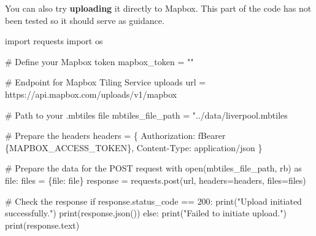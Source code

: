 \documentclass[
  letterpaper,
  DIV=11,
  numbers=noendperiod]{scrreprt}
\newenvironment{Shaded}{\begin{snugshade}}{\end{snugshade}}
\newcommand{\BuiltInTok}[1]{\textcolor[rgb]{0.00,0.23,0.31}{#1}}
\newcommand{\CommentTok}[1]{\textcolor[rgb]{0.37,0.37,0.37}{#1}}
\newcommand{\ControlFlowTok}[1]{\textcolor[rgb]{0.00,0.23,0.31}{#1}}
\newcommand{\DecValTok}[1]{\textcolor[rgb]{0.68,0.00,0.00}{#1}}
\newcommand{\ErrorTok}[1]{\textcolor[rgb]{0.68,0.00,0.00}{#1}}
\newcommand{\ImportTok}[1]{\textcolor[rgb]{0.00,0.46,0.62}{#1}}
\newcommand{\NormalTok}[1]{\textcolor[rgb]{0.00,0.23,0.31}{#1}}
\newcommand{\OperatorTok}[1]{\textcolor[rgb]{0.37,0.37,0.37}{#1}}
\newcommand{\SpecialCharTok}[1]{\textcolor[rgb]{0.37,0.37,0.37}{#1}}
\newcommand{\SpecialStringTok}[1]{\textcolor[rgb]{0.13,0.47,0.30}{#1}}
\newcommand{\StringTok}[1]{\textcolor[rgb]{0.13,0.47,0.30}{#1}}
\begin{document}
You can also try \textbf{uploading} it directly to Mapbox. This part of
the code has not been tested so it should serve as guidance.

\begin{Shaded}
\begin{Highlighting}[]
\ImportTok{import}\NormalTok{ requests}
\ImportTok{import}\NormalTok{ os}

\CommentTok{\# Define your Mapbox token}
\NormalTok{mapbox\_token }\OperatorTok{=} \StringTok{""}

\CommentTok{\# Endpoint for Mapbox Tiling Service uploads}
\NormalTok{url }\OperatorTok{=} \StringTok{\textquotesingle{}https://api.mapbox.com/uploads/v1/mapbox\textquotesingle{}}

\CommentTok{\# Path to your .mbtiles file}
\NormalTok{mbtiles\_file\_path }\OperatorTok{=} \StringTok{"../data/liverpool.mbtiles\textquotesingle{}}

\ErrorTok{\# Prepare the headers}
\NormalTok{headers }\OperatorTok{=}\NormalTok{ \{}
    \StringTok{\textquotesingle{}Authorization\textquotesingle{}}\NormalTok{: }\SpecialStringTok{f\textquotesingle{}Bearer }\SpecialCharTok{\{}\NormalTok{MAPBOX\_ACCESS\_TOKEN}\SpecialCharTok{\}}\SpecialStringTok{\textquotesingle{}}\NormalTok{,}
    \StringTok{\textquotesingle{}Content{-}Type\textquotesingle{}}\NormalTok{: }\StringTok{\textquotesingle{}application/json\textquotesingle{}}
\NormalTok{\}}

\CommentTok{\# Prepare the data for the POST request}
\ControlFlowTok{with} \BuiltInTok{open}\NormalTok{(mbtiles\_file\_path, }\StringTok{\textquotesingle{}rb\textquotesingle{}}\NormalTok{) }\ImportTok{as} \BuiltInTok{file}\NormalTok{:}
\NormalTok{    files }\OperatorTok{=}\NormalTok{ \{}\StringTok{\textquotesingle{}file\textquotesingle{}}\NormalTok{: }\BuiltInTok{file}\NormalTok{\}}
\NormalTok{    response }\OperatorTok{=}\NormalTok{ requests.post(url, headers}\OperatorTok{=}\NormalTok{headers, files}\OperatorTok{=}\NormalTok{files)}

\CommentTok{\# Check the response}
\ControlFlowTok{if}\NormalTok{ response.status\_code }\OperatorTok{==} \DecValTok{200}\NormalTok{:}
    \BuiltInTok{print}\NormalTok{(}\StringTok{"Upload initiated successfully."}\NormalTok{)}
    \BuiltInTok{print}\NormalTok{(response.json())}
\ControlFlowTok{else}\NormalTok{:}
    \BuiltInTok{print}\NormalTok{(}\StringTok{"Failed to initiate upload."}\NormalTok{)}
    \BuiltInTok{print}\NormalTok{(response.text)}
\end{Highlighting}
\end{Shaded}
\end{document}
